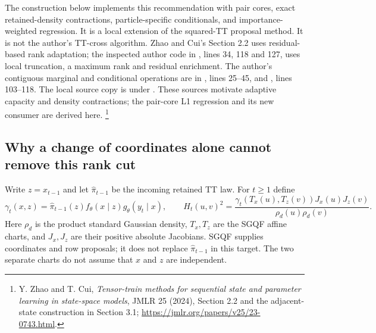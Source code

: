 \documentclass[11pt]{article}
\begin{document}
The construction below implements this recommendation with pair cores,
exact retained-density contractions, particle-specific conditionals, and
importance-weighted regression. It is a local extension of the squared-TT
proposal method. It is not the author's TT-cross algorithm. Zhao and Cui's
Section 2.2 uses residual-based rank adaptation; the inspected author code
in , lines 34, 118 and 127,
uses local truncation, a maximum rank and residual enrichment. The author's
contiguous marginal and conditional operations are in
, lines 25--45, and
, lines 103--118. The local source copy is
under . These sources motivate
adaptive capacity and density contractions; the pair-core L1 regression and
its new consumer are derived here.
\footnote{Y. Zhao and T. Cui, \emph{Tensor-train methods for sequential state and parameter
learning in state-space models}, JMLR 25 (2024), Section 2.2 and the adjacent-state
construction in Section 3.1;
\url{https://jmlr.org/papers/v25/23-0743.html}.}

\subsection{Why a change of coordinates alone cannot remove this rank cut}

Write $z=x_{t-1}$ and let $\widehat\pi_{t-1}$ be the incoming retained TT
law. For $t\geq1$ define
\begin{equation}
 \gamma_t(x,z)=\widehat\pi_{t-1}(z)f_\theta(x\mid z)g_\theta(y_t\mid x),
 \qquad
 H_t(u,v)^2=
 \frac{\gamma_t(T_x(u),T_z(v))J_x(u)J_z(v)}{\rho_d(u)\rho_d(v)}.
 \label{eq:pair-target}
\end{equation}
Here $\rho_d$ is the product standard Gaussian density, $T_x,T_z$ are the
SGQF affine charts, and $J_x,J_z$ are their positive absolute Jacobians.
SGQF supplies coordinates and row proposals; it does not replace
$\widehat\pi_{t-1}$ in this target. The two separate charts do not assume that
$x$ and $z$ are independent.
\end{document}
